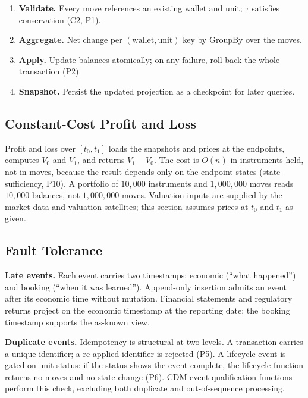 \documentclass[11pt,a4paper]{article}
\begin{document}
\begin{enumerate}[nosep]
\item \textbf{Validate.} Every move references an existing wallet and unit; $\tau$ satisfies conservation (C2, P1).
\item \textbf{Aggregate.} Net change per $(\text{wallet},\text{unit})$ key by GroupBy over the moves.
\item \textbf{Apply.} Update balances atomically; on any failure, roll back the whole transaction (P2).
\item \textbf{Snapshot.} Persist the updated projection as a checkpoint for later queries.
\end{enumerate}

\subsection{Constant-Cost Profit and Loss}
\label{sec:implementation-pnl}

Profit and loss over $[t_0,t_1]$ loads the snapshots and prices at the endpoints, computes $V_0$ and $V_1$, and returns $V_1-V_0$. The cost is $O(n)$ in instruments held, not in moves, because the result depends only on the endpoint states (state-sufficiency, P10). A portfolio of $10{,}000$ instruments and $1{,}000{,}000$ moves reads $10{,}000$ balances, not $1{,}000{,}000$ moves. Valuation inputs are supplied by the market-data and valuation satellites; this section assumes prices at $t_0$ and $t_1$ as given.

\subsection{Fault Tolerance}
\label{sec:implementation-faults}

\noindent\textbf{Late events.} Each event carries two timestamps: economic (``what happened'') and booking (``when it was learned''). Append-only insertion admits an event after its economic time without mutation. Financial statements and regulatory returns project on the economic timestamp at the reporting date; the booking timestamp supports the as-known view.

\noindent\textbf{Duplicate events.} Idempotency is structural at two levels. A transaction carries a unique identifier; a re-applied identifier is rejected (P5). A lifecycle event is gated on unit status: if the status shows the event complete, the lifecycle function returns no moves and no state change (P6). CDM event-qualification functions perform this check, excluding both duplicate and out-of-sequence processing.
\end{document}
